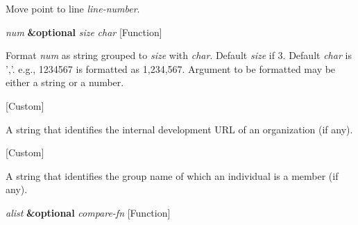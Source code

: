 \begin{doc-string}
Move point to line \emph{line-number}.
\end{doc-string}

\vspace{1em}
\noindent
{}
\usebox{\funcname}\emph{num} \textbf{\&optional} \emph{size} \emph{char}
 \hfill [Function]

\begin{doc-string}
Format \emph{num} as string grouped to \emph{size} with \emph{char}.  Default \emph{size} if 3.  Default \emph{char}
is ','.  e.g., 1234567 is formatted as 1,234,567.  Argument to be formatted may be
either a string or a number.
\end{doc-string}

\vspace{1em}
\noindent
{}
\usebox{\funcname}
 \hfill [Custom]

\begin{doc-string}
A string that identifies the internal development URL of an organization
(if any).
\end{doc-string}

\vspace{1em}
\noindent
{}
\usebox{\funcname}
 \hfill [Custom]

\begin{doc-string}
A string that identifies the group name of which an individual is a member
(if any).
\end{doc-string}

\vspace{1em}
\noindent
{}
\usebox{\funcname}\emph{alist} \textbf{\&optional} \emph{compare-fn}
 \hfill [Function]

